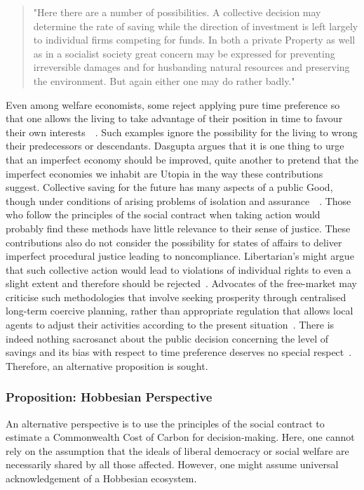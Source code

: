 \documentclass[11pt, oneside]{book}   	%
\begin{document}
\begin{quote}
"Here there are a number of possibilities. A collective decision may determine the rate of saving while the direction of investment is left largely to individual firms competing for funds. In both a private Property as well as in a socialist society great concern may be expressed for preventing irreversible damages and for husbanding natural resources and preserving the environment. But again either one may do rather badly."~\cite{jr1}
\end{quote}

Even among welfare economists, some reject applying pure time preference so that one allows the living to take advantage of their position in time to favour their own interests~\cite{hs1}~\cite{fr1}. Such examples ignore the possibility for the living to wrong their predecessors or descendants. Dasgupta argues that it is one thing to urge that an imperfect economy should be improved, quite another to pretend that the imperfect economies we inhabit are Utopia in the way these contributions suggest. Collective saving for the future has many aspects of a public Good, though under conditions of arising problems of isolation and assurance~\cite{as1}~\cite{ms1}.  Those who follow the principles of the social contract when taking action would probably find these methods have little relevance to their sense of justice. These contributions also do not consider the possibility for states of affairs to deliver imperfect procedural justice leading to noncompliance. Libertarian's might argue that such collective action would lead to violations of individual rights to even a slight extent and therefore should be rejected~\cite{rn1}. Advocates of the free-market may criticise such methodologies that involve seeking prosperity through centralised long-term coercive planning, rather than appropriate regulation that allows local agents to adjust their activities according to the present situation~\cite{fh1}. There is indeed nothing sacrosanct about the public decision concerning the level of savings and its bias with respect to time preference deserves no special respect~\cite{jr1}. Therefore, an alternative proposition is sought.

\subsubsection{Proposition: Hobbesian Perspective}

An alternative perspective is to use the principles of the social contract to estimate a Commonwealth Cost of Carbon for decision-making.
Here, one cannot rely on the assumption that the ideals of liberal democracy or social welfare are necessarily shared by all those affected.
However, one might assume universal acknowledgement of a Hobbesian ecosystem.
\end{document}
